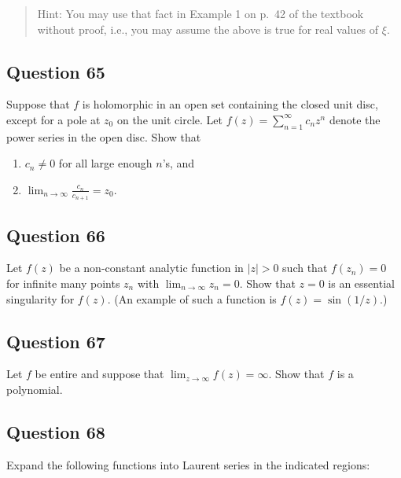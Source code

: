 \documentclass[12pt]{article}
\begin{document}
\begin{quote}
Hint: You may use that fact in Example 1 on p.~42 of the textbook
without proof, i.e., you may assume the above is true for real values of
\(\xi\).
\end{quote}

\hypertarget{question-65-2}{%
\subsection{Question 65}\label{question-65-2}}

Suppose that \(f\) is holomorphic in an open set containing the closed
unit disc, except for a pole at \(z_0\) on the unit circle. Let
\(f(z) = \sum_{n = 1}^\infty c_n z^n\) denote the power series in the
open disc. Show that

\begin{enumerate}
\def\labelenumi{(\arabic{enumi})}
\item
  \(c_n \neq 0\) for all large enough \(n\)'s, and
\item
  \(\displaystyle \lim_{n \rightarrow \infty} \frac{c_n}{c_{n+1}}= z_0\).
\end{enumerate}

\hypertarget{question-66-2}{%
\subsection{Question 66}\label{question-66-2}}

Let \(f(z)\) be a non-constant analytic function in \(|z|>0\) such that
\(f(z_n) = 0\) for infinite many points \(z_n\) with
\(\lim_{n \rightarrow \infty} z_n =0\). Show that \(z=0\) is an
essential singularity for \(f(z)\). (An example of such a function is
\(f(z) = \sin (1/z)\).)

\hypertarget{question-67-2}{%
\subsection{Question 67}\label{question-67-2}}

Let \(f\) be entire and suppose that
\(\lim_{z \rightarrow \infty} f(z) = \infty\). Show that \(f\) is a
polynomial.

\hypertarget{question-68-2}{%
\subsection{Question 68}\label{question-68-2}}

Expand the following functions into Laurent series in the indicated
regions:
\end{document}
